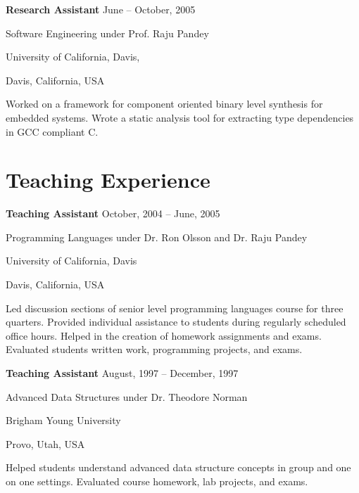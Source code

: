 \documentclass[margin,line,article,letterpaper]{res}
\newenvironment{list1}{
  \begin{list}{}{%
      \setlength{\itemsep}{0in}
      \setlength{\parsep}{0in} \setlength{\parskip}{0in}
      \setlength{\topsep}{0in} \setlength{\partopsep}{0in} 
      \setlength{\leftmargin}{0.17in}}}{\end{list}}
\newcommand{\timespan}[1]{#1}
\begin{document}
\begin{resume}
\textbf{Research Assistant} \hfill \timespan{June -- October, 2005}\\
\vspace{-10pt}
\begin{list1}
\item Software Engineering under Prof. Raju Pandey
\item University of California, Davis,
\item Davis, California, USA
\vspace{6pt}
\item Worked on a framework for component oriented binary level synthesis for embedded 
systems. Wrote a static analysis tool for extracting type dependencies in GCC compliant 
C. 
\end{list1}

\section{Teaching Experience}
\textbf{Teaching Assistant} \hfill \timespan{October, 2004 -- June, 2005}\\
\vspace{-10pt}
\begin{list1}
\item Programming Languages under Dr. Ron Olsson and Dr. Raju Pandey
\item University of California, Davis
\item Davis, California, USA
\vspace{6pt}
\item Led discussion sections of senior level programming languages course for three quarters.
Provided individual assistance to students during regularly scheduled office hours. 
Helped in the creation of homework assignments and exams. Evaluated students written 
work, programming projects, and exams. 
\end{list1}

\textbf{Teaching Assistant} \hfill \timespan{August, 1997 -- December, 1997}\\
\vspace{-10pt}
\begin{list1}
\item Advanced Data Structures under Dr. Theodore Norman
\item Brigham Young University
\item Provo, Utah, USA
\vspace{6pt}
\item Helped students understand advanced data structure concepts in group and one on one 
settings. Evaluated course homework, lab projects, and exams. 
\end{list1}




\end{resume}
\end{document}
